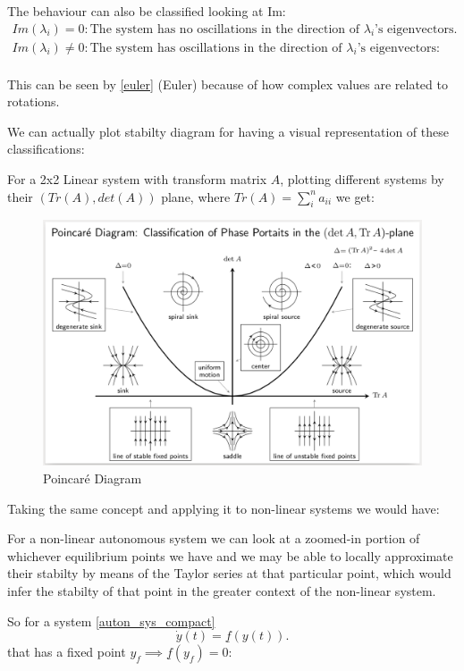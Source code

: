 The behaviour can also be classified looking at Im:
\begin{gather*}
Im(\lambda_i) = 0 : \text{The system has no oscillations in the direction of } \lambda_i \text{'s eigenvectors.} \\
Im(\lambda_i) \neq 0 : \text{The system has oscillations in the direction of } \lambda_i \text{'s eigenvectors:} \\
\end{gather*}

This can be seen by \ref{euler} (Euler) because of how complex values are related to rotations.

We can actually plot stabilty diagram for having a visual representation of these classifications:

For a 2x2 Linear system with transform matrix $A$, plotting different systems by their $(Tr(A), det(A))$ plane, where $Tr(A) = \sum_{i}^{n}a_{ii}$ we get:

\begin{figure}[H]
\includegraphics[width=13cm]{math_pics/Stability_Diagram.png}
\centering
\caption{Poincaré Diagram}
\end{figure}

\newpage
Taking the same concept and applying it to non-linear systems we would have:

For a non-linear autonomous system we can look at a zoomed-in portion of whichever equilibrium points we have and we may be able to locally approximate their stabilty by means of the Taylor series at that particular point, which would infer the stabilty of that point in the greater context of the non-linear system.

So for a system \ref{auton_sys_compact}
\[
\dot{y}(t) = \underline{f}(y(t)).
\] that has a fixed point $y_f \implies \underline{f}(y_f) = 0$:

